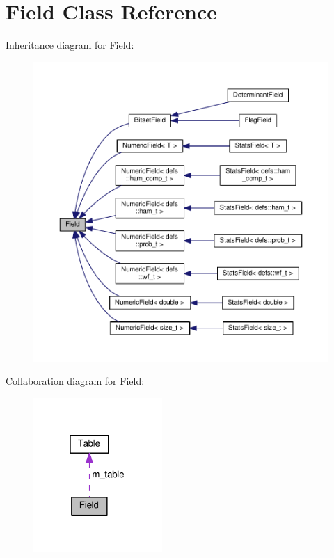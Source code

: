 \hypertarget{classField}{}\section{Field Class Reference}
\label{classField}


Inheritance diagram for Field\+:
\nopagebreak
\begin{figure}[H]
\begin{center}
\leavevmode
\includegraphics[width=350pt]{classField__inherit__graph}
\end{center}
\end{figure}


Collaboration diagram for Field\+:
\nopagebreak
\begin{figure}[H]
\begin{center}
\leavevmode
\includegraphics[width=139pt]{classField__coll__graph}
\end{center}
\end{figure}
